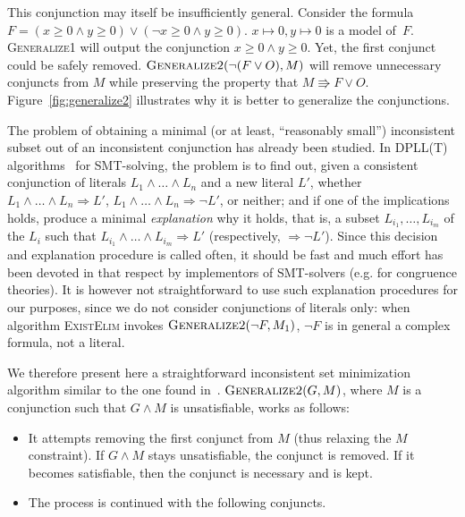 This conjunction may itself be insufficiently general. Consider the formula $F = (x \geq 0 \wedge y \geq 0) \vee (\neg {x \geq 0} \wedge y \geq 0)$. $x \mapsto 0, y \mapsto 0$ is a model of~$F$. \textsc{Generalize1} will output the conjunction $x \geq 0 \wedge y \geq 0$. Yet, the first conjunct could be safely removed. $\textsc{Generalize2}(\neg(F \vee O), M)$ will remove unnecessary conjuncts from $M$ while preserving the property that $M \Rrightarrow F \vee O$. Figure~\ref{fig:generalize2} illustrates why it is better to generalize the conjunctions.

The problem of obtaining a minimal (or at least, ``reasonably small'') inconsistent subset out of an inconsistent conjunction has already been studied. In DPLL(T) algorithms~\cite{Ganzingeretal2004CAV} for SMT-solving, the problem is to find out, given a consistent conjunction of literals $L_1 \wedge \dots \wedge L_n$ and a new literal $L'$, whether $L_1 \wedge \dots \wedge L_n \Rightarrow L'$, $L_1 \wedge \dots \wedge L_n \Rightarrow \neg L'$, or neither; and if one of the implications holds, produce a minimal \emph{explanation} why it holds, that is, a subset $L_{i_1}, \dots, L_{i_m}$ of the $L_i$ such that $L_{i_1} \wedge \dots \wedge L_{i_m} \Rightarrow L'$ (respectively, $\Rightarrow \neg L'$). Since this decision and explanation procedure is called often, it should be fast and much effort has been devoted in that respect by implementors of SMT-solvers (e.g. \cite{NieuwenhuisOliverasIC2007} for congruence theories). It is however not straightforward to use such explanation procedures for our purposes, since we do not consider conjunctions of literals only: when algorithm \textsc{ExistElim} invokes $\textsc{Generalize2}(\neg F, M_1)$, $\neg F$ is in general a complex formula, not a literal.

We therefore present here a straightforward inconsistent set minimization algorithm similar to the one found in~\cite[\S6]{dMRS:CADE2002}.
$\textsc{Generalize2}(G, M)$, where $M$ is a conjunction such that $G \wedge M$ is unsatisfiable, works as follows:
\begin{itemize}
\item
It attempts removing the first conjunct from $M$ (thus relaxing the $M$ constraint). If $G \wedge M$ stays unsatisfiable, the conjunct is removed. If it becomes satisfiable, then the conjunct is necessary and is kept.
\item The process is continued with the following conjuncts.
\end{itemize}

